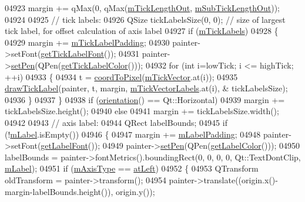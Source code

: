 \begin{DoxyCode}
04923   margin += qMax(0, qMax(\hyperlink{a00025_a2951f26d8a504d330157e05063513809}{mTickLengthOut}, \hyperlink{a00025_ae0342609ad543c2667673d75b43d9dbb}{mSubTickLengthOut}));
04924   
04925   \textcolor{comment}{// tick labels:}
04926   QSize tickLabelsSize(0, 0); \textcolor{comment}{// size of largest tick label, for offset calculation of axis label}
04927   \textcolor{keywordflow}{if} (\hyperlink{a00025_a3e4315be072026644e69009557a2fa11}{mTickLabels})
04928   \{
04929     margin += \hyperlink{a00025_ab3f2f5d923c83d952922149d0d1e2eb1}{mTickLabelPadding};
04930     painter->setFont(\hyperlink{a00025_aef30b66668986523225089a67280ec7a}{getTickLabelFont}());
04931     painter->\hyperlink{a00047_af9c7a4cd1791403901f8c5b82a150195}{setPen}(QPen(\hyperlink{a00025_a0f8583f7ac24ccc70d39fdd2389cad6e}{getTickLabelColor}()));
04932     \textcolor{keywordflow}{for} (\textcolor{keywordtype}{int} i=lowTick; i <= highTick; ++i)
04933     \{
04934       t = \hyperlink{a00025_a985ae693b842fb0422b4390fe36d299a}{coordToPixel}(\hyperlink{a00025_aae0f9b9973b85be601200f00f5825087}{mTickVector}.at(i));
04935       \hyperlink{a00025_a436ea8b8621fa3b897d3ca23b48d990a}{drawTickLabel}(painter, t, margin, \hyperlink{a00025_aeee4bd0fca3f587eafe33843d1cb4f82}{mTickVectorLabels}.at(i), &
      tickLabelsSize);
04936     \}
04937   \}
04938   \textcolor{keywordflow}{if} (\hyperlink{a00025_a57483f2f60145ddc9e63f3af53959265}{orientation}() == Qt::Horizontal)
04939     margin += tickLabelsSize.height();
04940   \textcolor{keywordflow}{else}
04941     margin += tickLabelsSize.width();
04942 
04943   \textcolor{comment}{// axis label:}
04944   QRect labelBounds;
04945   \textcolor{keywordflow}{if} (!\hyperlink{a00025_ae8001dbdfc47685c1cf7b98b044460e6}{mLabel}.isEmpty())
04946   \{
04947     margin += \hyperlink{a00025_ae392a7c1a88a58765a7ed899642d248a}{mLabelPadding};
04948     painter->setFont(\hyperlink{a00025_ab0768eb2879efb202645d19ff789e63e}{getLabelFont}());
04949     painter->\hyperlink{a00047_af9c7a4cd1791403901f8c5b82a150195}{setPen}(QPen(\hyperlink{a00025_a42bd69b9e9c571f13624079be18ccdc1}{getLabelColor}()));
04950     labelBounds = painter->fontMetrics().boundingRect(0, 0, 0, 0, Qt::TextDontClip, 
      \hyperlink{a00025_ae8001dbdfc47685c1cf7b98b044460e6}{mLabel});
04951     \textcolor{keywordflow}{if} (\hyperlink{a00025_ae704bf9f2c2b026f08dd4ccad79c616e}{mAxisType} == \hyperlink{a00025_ae2bcc1728b382f10f064612b368bc18aaf84aa6cac6fb6099f54a2cbf7546b730}{atLeft})
04952     \{
04953       QTransform oldTransform = painter->transform();
04954       painter->translate((origin.x()-margin-labelBounds.height()), origin.y());

\end{DoxyCode}
